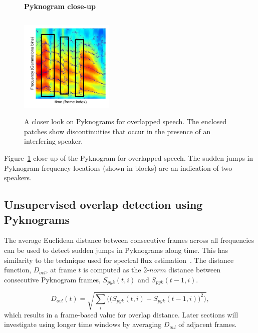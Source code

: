 {\begin{figure}[h!]
	\centering
	\vspace{1mm}
	\textbf{Pyknogram close-up}\par\medskip
	\vspace{-1mm}
	\includegraphics[height =2.0in, width=0.4\textwidth]{figures/co-channel_pyknogram-crop}
	\vspace{-1mm}
	\caption{ A closer look on Pyknograms for overlapped speech. The enclosed patches show discontinuities that occur in the presence of an interfering speaker.}
	\vspace{-1mm}
	\label{fig:ch2_pyknograms_for_overlaps}
\end{figure}

Figure~\ref{fig:ch2_pyknograms_for_overlaps} close-up of the Pyknogram for overlapped speech. 
The sudden jumps in Pyknogram frequency locations (shown in blocks) are an indication of two speakers. 

\newpage
\subsection{Unsupervised overlap detection using Pyknograms}
\label{ssec:unsupervised_ovl_det_pykno}
The average Euclidean distance between consecutive frames across all frequencies can be used to detect sudden jumps in Pyknograms along time. 
This has similarity to the technique used for spectral flux estimation~\cite{Rossignol_spectralflux}. 
The distance function, $D_{ovl}$, at frame $t$ is computed as the $2$-$norm$ distance between consecutive Pyknogram frames, $S_{pyk}(t,i)$ and $S_{pyk}(t-1,i)$. 

\begin{equation}
\label{eq:ovl_det_score}
D_{ovl}(t) = \sqrt{\sum_i\Big(\big(S_{pyk}(t,i)-S_{pyk}(t-1,i)\big)^2\Big)},
\end{equation}
which results in a frame-based value for overlap distance. 
Later sections will investigate using longer time windows by averaging $D_{ovl}$ of adjacent frames. 

}
